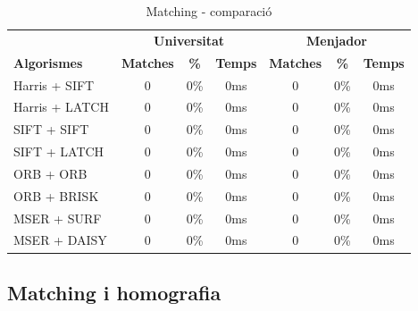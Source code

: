 		\begin{table}[H]
			\begin{center}
				\begin{tabular}{l | c c c | c c c}
					& \multicolumn{3}{c|}{\textbf{Universitat}} & \multicolumn{3}{c}{\textbf{Menjador}} \\
					\textbf{Algorismes} & \textbf{Matches} & \textbf{\%} & \textbf{Temps} & \textbf{Matches} & \textbf{\%} & \textbf{Temps} \\ \hline
					Harris + SIFT & 0 & 0\% & 0ms & 0 & 0\% & 0ms \\
					Harris + LATCH & 0 & 0\% & 0ms & 0 & 0\% & 0ms \\
					SIFT + SIFT & 0 & 0\% & 0ms & 0 & 0\% & 0ms \\
					SIFT + LATCH & 0 & 0\% & 0ms & 0 & 0\% & 0ms \\
					ORB + ORB & 0 & 0\% & 0ms & 0 & 0\% & 0ms \\
					ORB + BRISK & 0 & 0\% & 0ms & 0 & 0\% & 0ms \\
					MSER + SURF & 0 & 0\% & 0ms & 0 & 0\% & 0ms \\
					MSER + DAISY & 0 & 0\% & 0ms & 0 & 0\% & 0ms \\
				\end{tabular}
			\end{center}
			\caption{Matching - comparació}
		\end{table}

\newpage
	\subsection{Matching i homografia}


